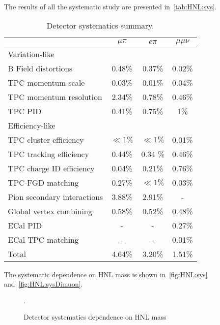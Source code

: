 \documentclass[../main.tex]{subfiles}
\begin{document}
The results of all the systematic study are presented in~\autoref{tab:HNL:sys}.
\begin{table}[!ht]
\begin{center}
\begin{tabular}{|l |c| c| c|}
  \hline
   & $\mu\pi$ & $e\pi$ & $\mu\mu\nu$\\
  \hline
  \multicolumn{4}{||l|}{Variation-like} \\
  \hline
  B Field distortions                 & 0.48\%    & 0.37\%         &  0.02\%\\
  TPC momentum scale                  & 0.03\%    & 0.01\%         & 0.04\%\\
  TPC momentum resolution             & 2.34\%    & 0.78\%         & 0.46\%\\
  TPC PID                             & 0.41\%    & 0.75\%         & 1\%\\
  \hline
  \multicolumn{4}{||l|}{Efficiency-like} \\
  \hline
  TPC cluster efficiency              &   $\ll1\%$   &   $\ll1\%$  &  0.01\%\\
  TPC tracking efficiency             &   0.44\%     &  0.34 \%    & 0.46\% \\
  TPC charge ID efficiency            &   0.04\%     &   0.21\%    &   0.76\%\\
  TPC-FGD matching                    &   0.27\%     &    $\ll1\%$ & 0.03\%\\
  Pion secondary interactions         &   3.88\%     &   2.91\%    &  - \\
  Global vertex combining             &    0.58\%    &  0.52\%     & 0.48\%\\
  ECal PID                            &     -        &     -       & 0.27\%\\
  ECal TPC matching                   &     -        &     -       &  0.01\%\\
  \hline
  Total                               &   4.64\%     &  3.20\%     & 1.51\%\\
  \hline
\end{tabular}
\caption{Detector systematics summary.}
\label{tab:HNL:sys}
\end{center}
\end{table}

The systematic dependence on HNL mass is shown in~\autoref{fig:HNL:sys} and~\autoref{fig:HNL:sysDimuon}.

\begin{figure}[!ht]
  \begin{minipage}{0.49\linewidth}
  \end{minipage}
  \begin{minipage}{0.49\linewidth}
  \end{minipage}
  \caption{Detector systematics dependence on HNL mass}.
  \label{fig:HNL:sys}
\end{figure}
\end{document}
